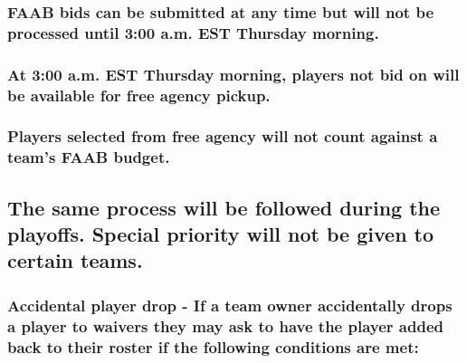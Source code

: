 \documentclass[
]{book}
\begin{document}
\hypertarget{faab-bids-can-be-submitted-at-any-time-but-will-not-be-processed-until-300-a.m.-est-thursday-morning.}{%
\subsubsection{FAAB bids can be submitted at any time but will not be processed until 3:00 a.m. EST Thursday morning.}\label{faab-bids-can-be-submitted-at-any-time-but-will-not-be-processed-until-300-a.m.-est-thursday-morning.}}

\hypertarget{at-300-a.m.-est-thursday-morning-players-not-bid-on-will-be-available-for-free-agency-pickup.}{%
\subsubsection{At 3:00 a.m. EST Thursday morning, players not bid on will be available for free agency pickup.}\label{at-300-a.m.-est-thursday-morning-players-not-bid-on-will-be-available-for-free-agency-pickup.}}

\hypertarget{players-selected-from-free-agency-will-not-count-against-a-teams-faab-budget.}{%
\subsubsection{Players selected from free agency will not count against a team's FAAB budget.}\label{players-selected-from-free-agency-will-not-count-against-a-teams-faab-budget.}}

\hypertarget{the-same-process-will-be-followed-during-the-playoffs.-special-priority-will-not-be-given-to-certain-teams.}{%
\subsection{The same process will be followed during the playoffs. Special priority will not be given to certain teams.}\label{the-same-process-will-be-followed-during-the-playoffs.-special-priority-will-not-be-given-to-certain-teams.}}

\hypertarget{accidental-player-drop---if-a-team-owner-accidentally-drops-a-player-to-waivers-they-may-ask-to-have-the-player-added-back-to-their-roster-if-the-following-conditions-are-met}{%
\subsubsection{Accidental player drop - If a team owner accidentally drops a player to waivers they may ask to have the player added back to their roster if the following conditions are met:}\label{accidental-player-drop---if-a-team-owner-accidentally-drops-a-player-to-waivers-they-may-ask-to-have-the-player-added-back-to-their-roster-if-the-following-conditions-are-met}}
\end{document}
